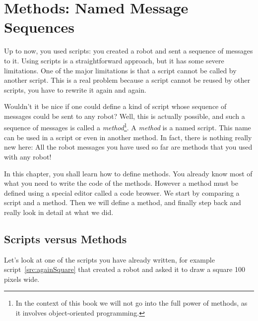 \ifx\wholebook\relax\else



\fi
\chapter{Methods: Named Message Sequences}\label{ch:turtleTeaching}\label{ch:abstraction}\label{cha:enseigner}




Up to now, you used scripts: you created a robot and sent a sequence of messages to it. Using scripts is a straightforward approach, but it has some severe limitations. One of the major limitations is that a script cannot be called by another script. This is a real problem because a script cannot be reused by other scripts, you have to rewrite it again and again. 

Wouldn't it be nice if one could define a kind of script whose sequence of messages could be sent to any robot? Well, this is actually possible, and such a sequence of messages is called a \emph{method}\footnote{In the context of this book we will not go into the full power of methods, as it involves object-oriented programming.}. A \emph{method} is a named script. This name can be used in a script or even in another method.  In fact, there is nothing really new here: All the robot messages you have used so far are methods that you used with any robot!
 
 In this chapter, you shall learn how to define methods. You already know most of what you need to write the code of the methods. However a method must be defined using  a special editor called   a code browser. We start by comparing a script and a method. Then we will define a method, and finally step back and really look in detail at what we did.


\section{Scripts versus Methods}
Let's look at one of the scripts you have already written, for example script~\ref{src:againSquare} that created a robot and asked it to draw a square 100 pixels wide. 

